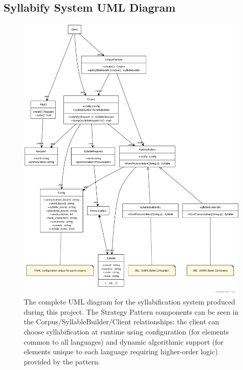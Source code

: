 \documentclass[11pt]{article}
\begin{document}
\subsection{Syllabify System UML Diagram}
\begin{figure}[h]
  \centering
  \includegraphics[scale=0.3]{UMLdiag.png}
  \caption{The complete UML diagram for the syllabification system produced during this project. The Strategy Pattern components can be seen in the Corpus/SyllableBuilder/Client relationships: the client can choose syllabification at runtime using configuration (for elements common to all languages) and dynamic algorithmic support (for elements unique to each language requiring higher-order logic) provided by the pattern.}
  \label{fig:UMLdiag}
\end{figure}

\newpage

\vskip 0.2in

\end{document}
